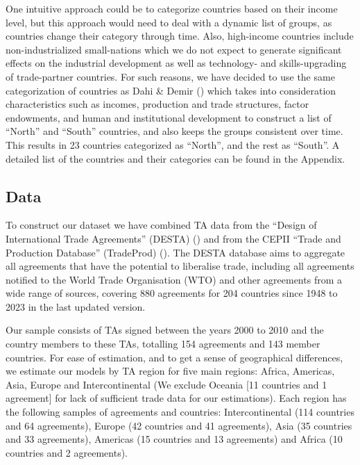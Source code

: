 One intuitive approach could be to categorize countries based on their
income level, but this approach would need to deal with a dynamic list
of groups, as countries change their category through time. Also,
high-income countries include non-industrialized small-nations which we
do not expect to generate significant effects on the industrial
development as well as technology- and skills-upgrading of trade-partner
countries. For such reasons, we have decided to use the same
categorization of countries as Dahi \& Demir (\cite{dahi_south-south_2017}) which
takes into consideration characteristics such as incomes, production and
trade structures, factor endowments, and human and institutional
development to construct a list of ``North'' and ``South'' countries,
and also keeps the groups consistent over time. This results in 23
countries categorized as ``North'', and the rest as ``South''. A
detailed list of the countries and their categories can be found in the
Appendix.
%
\subsection{Data}%
\label{subsec:Data}%

%
To construct our dataset we have combined TA data from the ``Design of
International Trade Agreements'' (DESTA) (\cite{dur_andreas_leonardo_baccini_and_manfred_elsig_design_2014})
 and from the CEPII ``Trade and Production
Database'' (TradeProd) (\cite{thierry_mayer_gianluca_santoni_vincent_vicard_cepii_2023}). 
The DESTA database aims to aggregate all agreements that have the
potential to liberalise trade, including all agreements notified to the
World Trade Organisation (WTO) and other agreements from a wide range of
sources, covering 880 agreements for 204 countries since 1948 to 2023 in
the last updated version.

Our sample consists of TAs signed between the years 2000 to 2010 and the
country members to these TAs, totalling 154 agreements and 143 member
countries. For ease of estimation, and to get a sense of geographical
differences, we estimate our models by TA region for five main regions:
Africa, Americas, Asia, Europe and Intercontinental (We exclude Oceania
{[}11 countries and 1 agreement{]} for lack of sufficient trade data for
our estimations). Each region has the following samples of agreements
and countries: Intercontinental (114 countries and 64 agreements),
Europe (42 countries and 41 agreements), Asia (35 countries and 33
agreements), Americas (15 countries and 13 agreements) and Africa (10
countries and 2 agreements).

